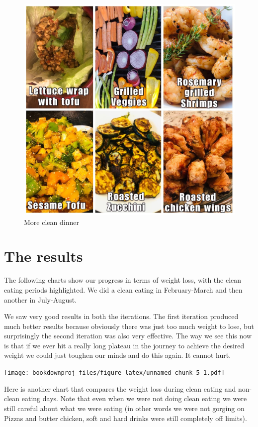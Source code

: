 \documentclass[
  oneside]{book}
\begin{document}
\begin{figure}
\centering
\includegraphics{pictures/dinner2.JPG}
\caption{More clean dinner}
\end{figure}

\pagebreak

\hypertarget{the-results}{%
\section{The results}\label{the-results}}

The following charts show our progress in terms of weight loss, with the clean eating periods highlighted. We did a clean eating in February-March and then another in July-August.

We saw very good results in both the iterations. The first iteration produced much better results because obviously there was just too much weight to lose, but surprisingly the second iteration was also very effective. The way we see this now is that if we ever hit a really long plateau in the journey to achieve the desired weight we could just toughen our minds and do this again. It cannot hurt.

\texttt{[image: bookdownproj\_files/figure-latex/unnamed-chunk-5-1.pdf]}

Here is another chart that compares the weight loss during clean eating and non-clean eating days. Note that even when we were not doing clean eating we were still careful about what we were eating (in other words we were not gorging on Pizzas and butter chicken, soft and hard drinks were still completely off limits).
\end{document}
